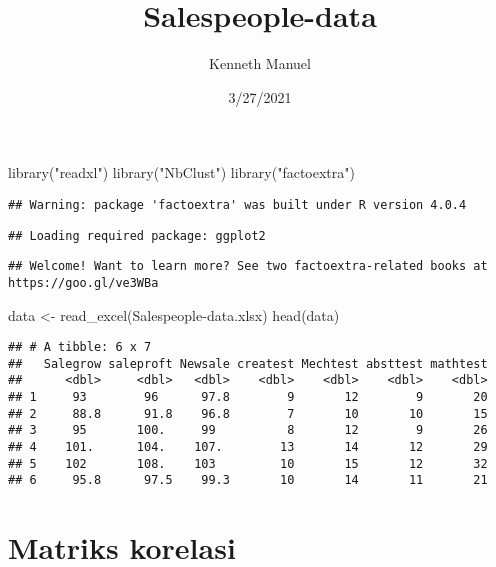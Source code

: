 \documentclass[
]{article}
\title{Salespeople-data}
\author{Kenneth Manuel}
\date{3/27/2021}
\newenvironment{Shaded}{\begin{snugshade}}{\end{snugshade}}
\newcommand{\FunctionTok}[1]{\textcolor[rgb]{0.00,0.00,0.00}{#1}}
\newcommand{\NormalTok}[1]{#1}
\newcommand{\OtherTok}[1]{\textcolor[rgb]{0.56,0.35,0.01}{#1}}
\newcommand{\StringTok}[1]{\textcolor[rgb]{0.31,0.60,0.02}{#1}}
\begin{document}
\maketitle

\begin{Shaded}
\begin{Highlighting}[]
\FunctionTok{library}\NormalTok{(}\StringTok{"readxl"}\NormalTok{)}
\FunctionTok{library}\NormalTok{(}\StringTok{"NbClust"}\NormalTok{)}
\FunctionTok{library}\NormalTok{(}\StringTok{"factoextra"}\NormalTok{)}
\end{Highlighting}
\end{Shaded}

\begin{verbatim}
## Warning: package 'factoextra' was built under R version 4.0.4
\end{verbatim}

\begin{verbatim}
## Loading required package: ggplot2
\end{verbatim}

\begin{verbatim}
## Welcome! Want to learn more? See two factoextra-related books at https://goo.gl/ve3WBa
\end{verbatim}

\begin{Shaded}
\begin{Highlighting}[]
\NormalTok{data }\OtherTok{\textless{}{-}} \FunctionTok{read\_excel}\NormalTok{(}\StringTok{\textquotesingle{}Salespeople{-}data.xlsx\textquotesingle{}}\NormalTok{)}
\FunctionTok{head}\NormalTok{(data)}
\end{Highlighting}
\end{Shaded}

\begin{verbatim}
## # A tibble: 6 x 7
##   Salegrow saleproft Newsale createst Mechtest absttest mathtest
##      <dbl>     <dbl>   <dbl>    <dbl>    <dbl>    <dbl>    <dbl>
## 1     93        96      97.8        9       12        9       20
## 2     88.8      91.8    96.8        7       10       10       15
## 3     95       100.     99          8       12        9       26
## 4    101.      104.    107.        13       14       12       29
## 5    102       108.    103         10       15       12       32
## 6     95.8      97.5    99.3       10       14       11       21
\end{verbatim}

\hypertarget{matriks-korelasi}{%
\section{Matriks korelasi}\label{matriks-korelasi}}
\end{document}
